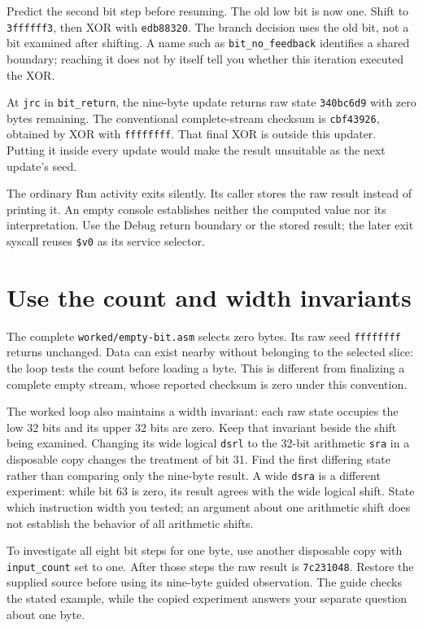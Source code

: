 Predict the second bit step before resuming. The old low bit is now one.
Shift to \texttt{3ffffff3}, then XOR with \texttt{edb88320}. The branch decision
uses the old bit, not a bit examined after shifting. A name such as
\texttt{bit\_no\_feedback} identifies a shared boundary; reaching it does not
by itself tell you whether this iteration executed the XOR.

At \texttt{jrc} in \texttt{bit\_return}, the nine-byte update returns raw state
\texttt{340bc6d9} with zero bytes remaining. The conventional complete-stream
checksum is \texttt{cbf43926}, obtained by XOR with \texttt{ffffffff}. That final
XOR is outside this updater. Putting it inside every update would make the
result unsuitable as the next update's seed.

The ordinary Run activity exits silently. Its caller stores the raw result
instead of printing it. An empty console establishes neither the computed value
nor its interpretation. Use the Debug return boundary or the stored result;
the later exit syscall reuses \texttt{\$v0} as its service selector.

\section{Use the count and width invariants}

The complete \texttt{worked/\allowbreak empty-bit.asm} selects zero bytes.
Its raw seed \texttt{ffffffff} returns unchanged. Data can exist
nearby without belonging to the selected slice: the loop tests the count before
loading a byte. This is different from finalizing a complete empty stream, whose
reported checksum is zero under this convention.

The worked loop also maintains a width invariant: each raw state occupies the
low 32 bits and its upper 32 bits are zero. Keep that invariant beside the shift
being examined. Changing its wide logical \texttt{dsrl} to the 32-bit arithmetic
\texttt{sra} in a disposable copy changes the treatment of bit 31. Find the
first differing state rather than comparing only the nine-byte result.
A wide \texttt{dsra} is a different experiment: while bit 63 is zero, its result
agrees with the wide logical shift. State which instruction width you tested;
an argument about one arithmetic shift does not establish the behavior of all
arithmetic shifts.

To investigate all eight bit steps for one byte, use another disposable copy
with \texttt{input\_count} set to one. After those steps the raw result is
\texttt{7c231048}. Restore the supplied source before using its nine-byte guided
observation. The guide checks the stated example, while the copied experiment
answers your separate question about one byte.

